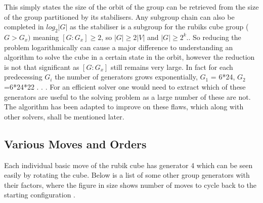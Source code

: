 \documentclass{article}
\newcounter{lem}[section]\setcounter{lem}{0}
\begin{document}
This simply states the size of the orbit of the group can be retrieved from the size of the group partitioned by its stabilisers. Any subgroup chain can also be completed in $log_{2}|G|$ as the stabiliser is a subgroup for the rubiks cube group ($G>G_{x})$ meaning $[G:G_{x}]\geq 2$, so $|G|\geq2|V|$ and $|G|\geq 2^{k}.$\cite{OrbStab}. So reducing the problem logarithmically can cause a major difference to understanding an algorithm to solve the cube in a certain state in the orbit, however the reduction is not that significant as $[G:G_{x}]$ still remains very large. In fact for each predecessing $G_{i}$ the number of generators grows exponentially, $G_{1}$ = 6*24, $G_{2}$=6*24*22 . . . For an efficient solver one would need to extract which of these generators are useful to the solving problem as a large number of these are not. The algorithm has been adapted to improve on these flaws, which along with other solvers, shall be mentioned later.

\subsection{Various Moves and Orders}

Each individual basic move of the rubik cube has generator 4 which can be seen easily by rotating the cube. Below is a list of some other group generators with their factors, where the figure in size shows number of moves to cycle back to the starting configuration \cite{gentable}.
\end{document}

